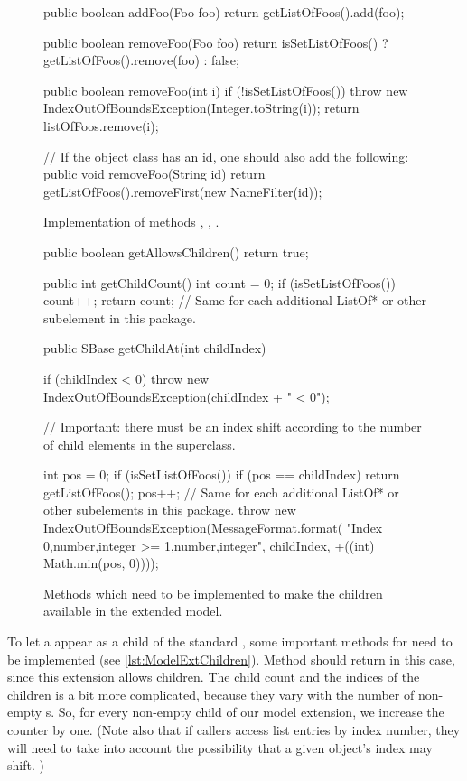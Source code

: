 \begin{figure}[t]
  \begin{example}[numbers=left]
public boolean addFoo(Foo foo) {
    return getListOfFoos().add(foo);
}

public boolean removeFoo(Foo foo) {
  return isSetListOfFoos() ? getListOfFoos().remove(foo) : false;
}

public boolean removeFoo(int i) {
  if (!isSetListOfFoos()) {
    throw new IndexOutOfBoundsException(Integer.toString(i));
  }
  return listOfFoos.remove(i);
}

// If the object class has an id, one should also add the following:
public void removeFoo(String id) {
  return getListOfFoos().removeFirst(new NameFilter(id));
}\end{example}
  \caption{Implementation of  methods ,
    , .}
  \label{lst:ModelExtAddRemoveFoos}
\end{figure}

\begin{figure}[hb]
  \begin{example}[numbers=left]
public boolean getAllowsChildren() {
  return true;
}

public int getChildCount() {
  int count = 0;
  if (isSetListOfFoos()) {
    count++;
  }
  return count;  // Same for each additional ListOf* or other subelement in this package.
}

public SBase getChildAt(int childIndex) {
  if (childIndex < 0) {
    throw new IndexOutOfBoundsException(childIndex + " < 0");
  }

  // Important: there must be an index shift according to the number of child elements in the superclass.

  int pos = 0;
  if (isSetListOfFoos()) {
    if (pos == childIndex) {
      return getListOfFoos();
    }
    pos++;
  }
  // Same for each additional ListOf* or other subelements in this package.
  throw new IndexOutOfBoundsException(MessageFormat.format(
    "Index {0,number,integer} >= {1,number,integer}", childIndex, +((int) Math.min(pos, 0))));
}\end{example}
  \caption{Methods which need to be implemented to make the children
    available in the extended model.}
  \label{lst:ModelExtChildren}
\end{figure}

To let a  appear as a child of the standard \Model, some
important methods for \TreeNode need to be implemented (see
\vref{lst:ModelExtChildren}).  Method  should
return  in this case, since this extension allows children.  The
child count and the indices of the children is a bit more complicated,
because they vary with the number of non-empty s.  So, for
every non-empty  child of our model extension, we increase the
counter by one.  (Note also that if callers access list entries by index
number, they will need to take into account the possibility that a given
object's index may shift. )


